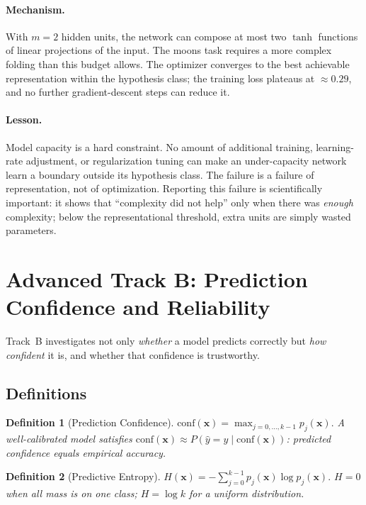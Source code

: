 \documentclass[11pt]{article}
\newcommand{\bx}{\mathbf{x}}
\newtheorem{definition}{Definition}
\begin{document}
\paragraph{Mechanism.}
With $m=2$ hidden units, the network can compose at most two $\tanh$ functions
of linear projections of the input.
The moons task requires a more complex folding than this budget allows.
The optimizer converges to the best achievable representation within the
hypothesis class; the training loss plateaus at $\approx0.29$, and no further
gradient-descent steps can reduce it.

\paragraph{Lesson.}
Model capacity is a hard constraint.
No amount of additional training, learning-rate adjustment, or regularization
tuning can make an under-capacity network learn a boundary outside its
hypothesis class.
The failure is a failure of representation, not of optimization.
Reporting this failure is scientifically important: it shows that
``complexity did not help'' only when there was \emph{enough} complexity;
below the representational threshold, extra units are simply wasted parameters.

\section{Advanced Track B: Prediction Confidence and Reliability}
\label{sec:track_b}

Track~B investigates not only \emph{whether} a model predicts correctly but
\emph{how confident} it is, and whether that confidence is trustworthy.

\subsection{Definitions}

\begin{definition}[Prediction Confidence]
$\mathrm{conf}(\bx)=\max_{j=0,\ldots,k-1}p_j(\bx).$
A well-calibrated model satisfies
$\mathrm{conf}(\bx)\approx P(\hat{y}=y\mid\mathrm{conf}(\bx))$:
predicted confidence equals empirical accuracy.
\end{definition}

\begin{definition}[Predictive Entropy]
$H(\bx)=-\sum_{j=0}^{k-1}p_j(\bx)\log p_j(\bx).$
$H=0$ when all mass is on one class; $H=\log k$ for a uniform distribution.
\end{definition}
\end{document}
